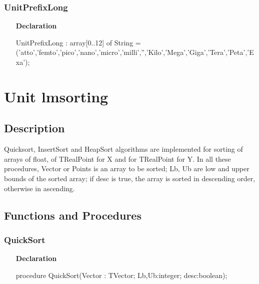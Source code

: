 \documentclass[12pt,a4paper,oneside]{report}
\newcommand{\lmath}[1]{   %
	\marginpar{\vspace{#1} 
		\begin{flushright}
			LMath
	\end{flushright} }
}
\newcommand{\declarationitem}[1]{\textbf{#1}}
\begin{document}
\subsubsection{UnitPrefixLong}
\label{lmunitsformat-UnitPrefixLong}
\begin{itemize}\item[\declarationitem{Declaration}\hfill]
	\begin{flushleft}
		\begin{ttfamily}
			UnitPrefixLong : array[0..12] of String =
			('atto','femto','pico','nano','micro','milli','','Kilo','Mega','Giga','Tera','Peta','Exa');\end{ttfamily}
		
	\end{flushleft}
	
\end{itemize}
\section{Unit lmsorting}\lmath{-24pt}
\label{lmsorting}
\subsection{Description}
Quicksort, InsertSort and HeapSort algorithms are implemented for sorting of arrays of float, of TRealPoint for X and for TRealPoint for Y. In all these procedures, Vector or Points is an array to be sorted; Lb, Ub are low and upper bounds of the sorted array; if desc is true, the array is sorted in descending order, otherwise in ascending.
\subsection{Functions and Procedures}
\subsubsection{QuickSort}
\label{lmsorting-QuickSort}
\begin{itemize}\item[\declarationitem{Declaration}\hfill]
	\begin{flushleft}
		\begin{ttfamily}
			procedure QuickSort(Vector : TVector; Lb,Ub:integer; desc:boolean);\end{ttfamily}
		
	\end{flushleft}
	
\end{itemize}
\end{document}
